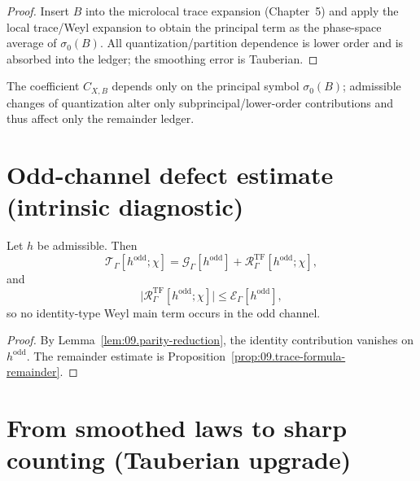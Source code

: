 \begin{proof}
Insert $B$ into the microlocal trace expansion (Chapter~5) and apply the local trace/Weyl expansion to obtain the principal term
as the phase-space average of $\sigma_0(B)$. All quantization/partition dependence is lower order and is absorbed into the ledger;
the smoothing error is Tauberian.
\end{proof}

\begin{remark}\label{rem:09.quantization-independence}
The coefficient $C_{X,B}$ depends only on the principal symbol $\sigma_0(B)$; admissible changes of quantization alter only
subprincipal/lower-order contributions and thus affect only the remainder ledger.
\end{remark}

\section{Odd-channel defect estimate (intrinsic diagnostic)}
\label{sec:09.odd-defect}

\begin{proposition}\label{prop:09.odd-channel}
Let $h$ be admissible. Then
\begin{equation}\label{eq:09.odd.channel}
\mathcal T_\Gamma[h^{\mathrm{odd}};\chi]
=
\mathcal G_\Gamma[h^{\mathrm{odd}}]
+
\mathcal R^{\mathrm{TF}}_\Gamma[h^{\mathrm{odd}};\chi],
\end{equation}
and
\[
\big|\mathcal R^{\mathrm{TF}}_\Gamma[h^{\mathrm{odd}};\chi]\big|
\le
\mathcal E_\Gamma[h^{\mathrm{odd}}],
\]
so no identity-type Weyl main term occurs in the odd channel.
\end{proposition}

\begin{proof}
By Lemma~\ref{lem:09.parity-reduction}, the identity contribution vanishes on $h^{\mathrm{odd}}$.
The remainder estimate is Proposition~\ref{prop:09.trace-formula-remainder}.
\end{proof}

\section{From smoothed laws to sharp counting (Tauberian upgrade)}
\label{sec:09.sharp}

